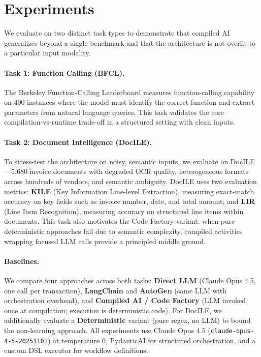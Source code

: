 \documentclass[11pt]{article}
\begin{document}
\section{Experiments}
\label{sec:experiments}

We evaluate on two distinct task types to demonstrate that compiled AI generalizes beyond a single benchmark and that the architecture is not overfit to a particular input modality.

\paragraph{Task 1: Function Calling (BFCL).} The Berkeley Function-Calling Leaderboard \citep{patil2024gorilla} measures function-calling capability on 400 instances where the model must identify the correct function and extract parameters from natural language queries. This task validates the core compilation-vs-runtime trade-off in a structured setting with clean inputs.

\paragraph{Task 2: Document Intelligence (DocILE).} To stress-test the architecture on noisy, semantic inputs, we evaluate on DocILE---5,680 invoice documents with degraded OCR quality, heterogeneous formats across hundreds of vendors, and semantic ambiguity. DocILE uses two evaluation metrics: \textbf{KILE} (Key Information Line-level Extraction), measuring exact-match accuracy on key fields such as invoice number, date, and total amount; and \textbf{LIR} (Line Item Recognition), measuring accuracy on structured line items within documents. This task also motivates the Code Factory variant: when pure deterministic approaches fail due to semantic complexity, compiled activities wrapping focused LLM calls provide a principled middle ground.

\paragraph{Baselines.} We compare four approaches across both tasks: \textbf{Direct LLM} (Claude Opus 4.5, one call per transaction), \textbf{LangChain} and \textbf{AutoGen} (same LLM with orchestration overhead), and \textbf{Compiled AI / Code Factory} (LLM invoked once at compilation; execution is deterministic code). For DocILE, we additionally evaluate a \textbf{Deterministic} variant (pure regex, no LLM) to bound the non-learning approach. All experiments use Claude Opus 4.5 (\texttt{claude-opus-4-5-20251101}) at temperature 0, PydanticAI for structured orchestration, and a custom DSL executor for workflow definitions.
\end{document}
